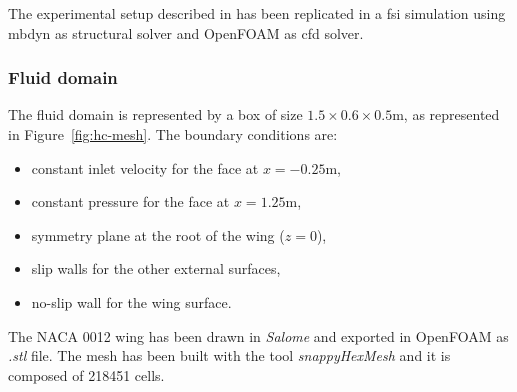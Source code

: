 The experimental setup described in \cite{heathcote2008effect} has been replicated in a \acrshort{fsi} simulation using \acrshort{mbdyn} as structural solver and OpenFOAM as \acrshort{cfd} solver.

\subsubsection{Fluid domain}

The fluid domain is represented by a box of size $1.5\times 0.6\times 0.5$\si{m}, as represented in Figure~\ref{fig:hc-mesh}. The boundary conditions are:

\begin{itemize}
    \item constant inlet velocity for the face at $x=-0.25$\si{m},
    \item constant pressure for the face at $x=1.25$\si{m},
    \item symmetry plane at the root of the wing ($z=0$),
    \item slip walls for the other external surfaces,
    \item no-slip wall for the wing surface.
\end{itemize}

The NACA 0012 wing has been drawn in \textit{Salome} and exported in OpenFOAM as \textit{.stl} file. The mesh has been built with the tool \textit{snappyHexMesh} and it is composed of 218451 cells. 



